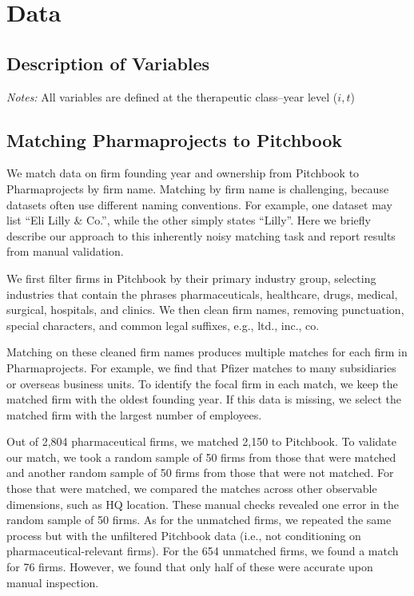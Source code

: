 \section{Data}\label{app:data}

\subsection{Description of Variables}

\begin{lighttable}[h!]
    \centering
    \footnotesize
    \caption*{\scriptsize\emph{Notes:} All variables are defined at the therapeutic class--year level ($i, t$)}
    \vspace{1em}
    \resizebox{\textwidth}{!}{
        
    }
    \label{app:description-of-variables}
    \vspace{1em}
\end{lighttable}


\subsection{Matching Pharmaprojects to Pitchbook}\label{app:matching_pharma_to_pitch}

We match data on firm founding year and ownership from Pitchbook to Pharmaprojects by firm name. Matching by firm name is challenging, because datasets often use different naming conventions. For example, one dataset may list ``Eli Lilly \& Co.'', while the other simply states ``Lilly''. Here we briefly describe our approach to this inherently noisy matching task and report results from manual validation.

We first filter firms in Pitchbook by their primary industry group, selecting industries that contain the phrases pharmaceuticals, healthcare, drugs, medical, surgical, hospitals, and clinics. We then clean firm names, removing punctuation, special characters, and common legal suffixes, e.g., ltd., inc., co.

Matching on these cleaned firm names produces multiple matches for each firm in Pharmaprojects. For example, we find that Pfizer matches to many subsidiaries or overseas business units. To identify the focal firm in each match, we keep the matched firm with the oldest founding year. If this data is missing, we select the matched firm with the largest number of employees.

Out of 2,804 pharmaceutical firms, we matched 2,150 to Pitchbook. To validate our match, we took a random sample of 50 firms from those that were matched and another random sample of 50 firms from those that were not matched. For those that were matched, we compared the matches across other observable dimensions, such as HQ location. These manual checks revealed one error in the random sample of 50 firms. As for the unmatched firms, we repeated the same process but with the unfiltered Pitchbook data (i.e., not conditioning on pharmaceutical-relevant firms). For the 654 unmatched firms, we found a match for 76 firms. However, we found that only half of these were accurate upon manual inspection.

